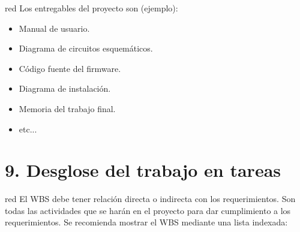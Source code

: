 \documentclass[
11pt, %
]{charter}
\begin{document}
{%
		

		
		

\begin{consigna}{red}
Los entregables del proyecto son (ejemplo):

\begin{itemize}
	\item Manual de usuario.
	\item Diagrama de circuitos esquemáticos.
	\item Código fuente del firmware.
	\item Diagrama de instalación.
	\item Memoria del trabajo final.
	\item etc...
\end{itemize}
\end{consigna}

\section{9. Desglose del trabajo en tareas}
\label{sec:wbs}

\begin{consigna}{red}
El WBS debe tener relación directa o indirecta con los requerimientos.  Son todas las actividades que se harán en el proyecto para dar cumplimiento a los requerimientos. Se recomienda mostrar el WBS mediante una lista indexada:


\end{consigna}}
\end{document}
